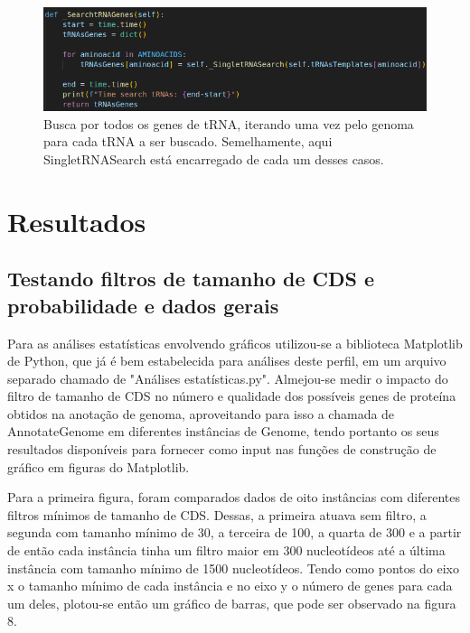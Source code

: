 \documentclass[brazilian,12pt,a4paper,final]{article}
\begin{document}
\begin{figure}[hbtp]
	\begin{center}
		\includegraphics[width=15cm]{../Figures/SearchtRNAGenes.png}
		\caption{Busca por todos os genes de tRNA, iterando uma vez pelo genoma para cada tRNA a ser buscado. Semelhamente, aqui SingletRNASearch está encarregado de cada um desses casos.}
		\label{fig}
	\end{center}
\end{figure}	
	
	\section{Resultados}
	\vspace{0.5cm}
	\subsection{Testando filtros de tamanho de CDS e probabilidade e dados gerais }
	Para as análises estatísticas envolvendo gráficos utilizou-se a biblioteca Matplotlib de Python, que já é bem estabelecida para análises deste perfil, em um arquivo separado chamado de "Análises estatísticas.py". Almejou-se medir o impacto do filtro de tamanho de CDS no número e qualidade dos possíveis genes de proteína obtidos na anotação de genoma, aproveitando para isso a chamada de AnnotateGenome em diferentes instâncias de Genome, tendo portanto os seus resultados disponíveis para fornecer como input nas funções de construção de gráfico em figuras do Matplotlib. 
	
	 \vspace{0.5cm}
	
	Para a primeira figura, foram comparados dados de oito instâncias com diferentes filtros mínimos de tamanho de CDS. Dessas, a primeira atuava sem filtro, a segunda com tamanho mínimo de 30, a terceira de 100, a quarta de 300 e a partir de então cada instância tinha um filtro maior em 300 nucleotídeos até a última instância com tamanho mínimo de 1500 nucleotídeos.
	Tendo como pontos do eixo x o tamanho mínimo de cada instância e no eixo y o número de genes para cada um deles, plotou-se então um gráfico de barras, que pode ser observado na figura 8.
	
\end{document}

